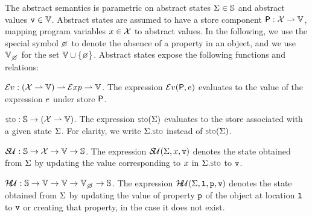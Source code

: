 %

 The abstract semantics is parametric on abstract states $\Sigma \in \mathbb{S}$ and abstract values $\mathtt{v} \in \mathbb{V}$.
Abstract states are assumed to have a store component ${\sf P}: \mathcal{X} \rightharpoonup \mathbb{V}$, mapping program variables $x \in \mathcal{X}$ to abstract values. 
In the following, we use the special symbol $\none$ to denote the absence of a property in an object, and we use $\setext{\absvals}{\none}$ for the set $\absvals \cup \{ \none \}$.
Abstract states expose the following functions and relations: 
\begin{description}
\setlength{\itemsep}{0.2em}
  \item[\jsil Expression Evaluation,] $\mathcal{E}v_{} :  (\mathcal{X} \rightharpoonup \mathbb{V})  \rightharpoonup \mathcal{E}xp \rightharpoonup \mathbb{V}$. 
  	The expression $\mathcal{E}v_{}({\sf P}, e)$ evaluates to the value of the \jsil expression $e$ under store ${\sf P}$. 

  \item[Store Selector,] $\stosel : \absstates \rightarrow (\jvars \partialmap \absvals)$. The expression $\stosel(\absstate)$ evaluates to the store associated with a given  state $\Sigma$. For clarity, we write $\absstate.\stosel$ instead of $\stosel(\absstate)$. 

  \item[Store Update,] $\mathcal{S\!U}_{}: \mathbb{S} \rightarrow \mathcal{X} \rightarrow \mathbb{V} \rightarrow \mathbb{S}$. 
             The expression $\mathcal{S\!U}_{}(\Sigma, x, \mathtt{v})$ denotes the state obtained from $\Sigma$ 
             by updating the value corresponding to $x$ in $\absstate.\stosel$ to $\mathtt{v}$. 

%             


   \item[Heap Update,] $\hpupdt{} : \absstates \rightarrow \absvals \rightarrow \absvals \rightarrow \setext{\absvals}{\none} \rightarrow \absstates$. 
             The expression $\mathcal{H\!U}_{}(\Sigma, \mathtt{l}, \mathtt{p}, \mathtt{v})$ denotes the state obtained from $\Sigma$ 
             by updating the value of property $\mathtt{p}$ of the object at location $\mathtt{l}$ to $\mathtt{v}$ or creating that property, in the
             case it does not exist.


\end{description}

